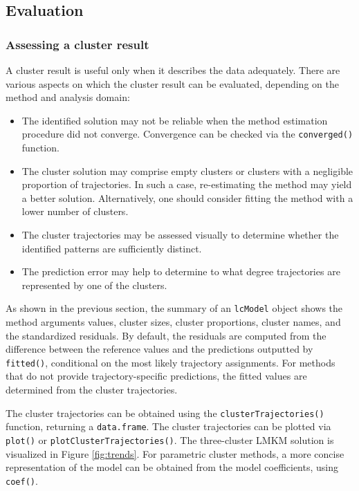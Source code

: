 \subsection{Evaluation}\label{evaluation}

\subsubsection{Assessing a cluster result}\label{assessing-a-cluster-result}

A cluster result is useful only when it describes the data adequately. There are various aspects on which the cluster result can be evaluated, depending on the method and analysis domain:

\begin{itemize}
\tightlist
\item
  The identified solution may not be reliable when the method estimation procedure did not converge. Convergence can be checked via the \texttt{converged()} function.
\item
  The cluster solution may comprise empty clusters or clusters with a negligible proportion of trajectories. In such a case, re-estimating the method may yield a better solution. Alternatively, one should consider fitting the method with a lower number of clusters.
\item
  The cluster trajectories may be assessed visually to determine whether the identified patterns are sufficiently distinct.
\item
  The prediction error may help to determine to what degree trajectories are represented by one of the clusters.
\end{itemize}

As shown in the previous section, the summary of an \texttt{lcModel} object shows the method arguments values, cluster sizes, cluster proportions, cluster names, and the standardized residuals. By default, the residuals are computed from the difference between the reference values and the predictions outputted by \texttt{fitted()}, conditional on the most likely trajectory assignments. For methods that do not provide trajectory-specific predictions, the fitted values are determined from the cluster trajectories.

The cluster trajectories can be obtained using the \texttt{clusterTrajectories()} function, returning a \texttt{data.frame}. The cluster trajectories can be plotted via \texttt{plot()} or \texttt{plotClusterTrajectories()}. The three-cluster LMKM solution is visualized in Figure \ref{fig:trends}. For parametric cluster methods, a more concise representation of the model can be obtained from the model coefficients, using \texttt{coef()}.

